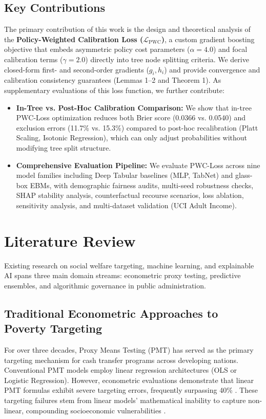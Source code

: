 \documentclass[conference]{IEEEtran}
\begin{document}
\subsection{Key Contributions}
The primary contribution of this work is the design and theoretical analysis of the \textbf{Policy-Weighted Calibration Loss ($\mathcal{L}_{\text{PWC}}$)}, a custom gradient boosting objective that embeds asymmetric policy cost parameters ($\alpha=4.0$) and focal calibration terms ($\gamma=2.0$) directly into tree node splitting criteria. We derive closed-form first- and second-order gradients ($g_i, h_i$) and provide convergence and calibration consistency guarantees (Lemmas 1--2 and Theorem 1). As supplementary evaluations of this loss function, we further contribute:
\begin{itemize}
\item \textbf{In-Tree vs. Post-Hoc Calibration Comparison:} We show that in-tree PWC-Loss optimization reduces both Brier score (0.0366 vs. 0.0540) and exclusion errors (11.7\% vs. 15.3\%) compared to post-hoc recalibration (Platt Scaling, Isotonic Regression), which can only adjust probabilities without modifying tree split structure.
\item \textbf{Comprehensive Evaluation Pipeline:} We evaluate PWC-Loss across nine model families including Deep Tabular baselines (MLP, TabNet) and glass-box EBMs, with demographic fairness audits, multi-seed robustness checks, SHAP stability analysis, counterfactual recourse scenarios, loss ablation, sensitivity analysis, and multi-dataset validation (UCI Adult Income).
\end{itemize}


\section{Literature Review}

Existing research on social welfare targeting, machine learning, and explainable AI spans three main domain streams: econometric proxy testing, predictive ensembles, and algorithmic governance in public administration.

\subsection{Traditional Econometric Approaches to Poverty Targeting}
For over three decades, Proxy Means Testing (PMT) has served as the primary targeting mechanism for cash transfer programs across developing nations. Conventional PMT models employ linear regression architectures (OLS or Logistic Regression). However, econometric evaluations demonstrate that linear PMT formulas exhibit severe targeting errors, frequently surpassing 40\% \cite{b4, b11}. These targeting failures stem from linear models' mathematical inability to capture non-linear, compounding socioeconomic vulnerabilities \cite{b2, b4}.
\end{document}
